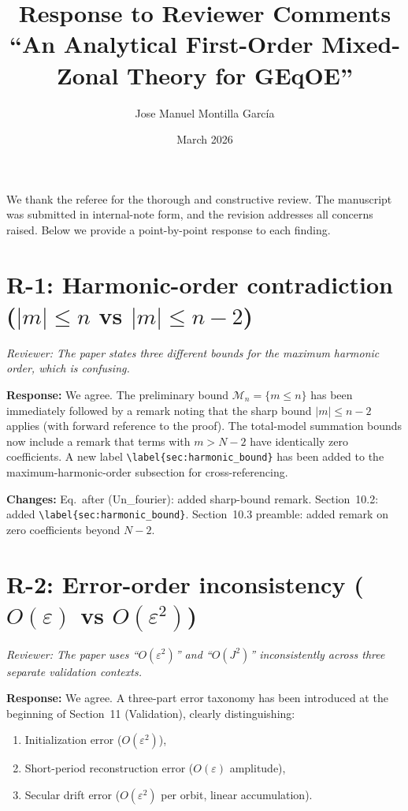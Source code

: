 \documentclass[11pt]{article}
\title{Response to Reviewer Comments\\[4pt]
\large ``An Analytical First-Order Mixed-Zonal Theory for GEqOE''}
\author{Jose Manuel Montilla Garc\'ia}
\date{March 2026}
\newcommand{\rev}[1]{\textcolor{revcolor}{\emph{#1}}}
\begin{document}
\maketitle

We thank the referee for the thorough and constructive review. The
manuscript was submitted in internal-note form, and the revision addresses
all concerns raised. Below we provide a point-by-point response to each
finding.

\bigskip

\section*{R-1: Harmonic-order contradiction ($|m| \le n$ vs $|m| \le n-2$)}

\rev{Reviewer: The paper states three different bounds for the maximum
harmonic order, which is confusing.}

\textbf{Response:} We agree. The preliminary bound $\mathcal{M}_n = \{m \le n\}$
has been immediately followed by a remark noting that the sharp bound
$|m| \le n-2$ applies (with forward reference to the proof). The total-model
summation bounds now include a remark that terms with $m > N-2$ have
identically zero coefficients. A new label \verb|\label{sec:harmonic_bound}|
has been added to the maximum-harmonic-order subsection for cross-referencing.

\textbf{Changes:} Eq.~after (Un\_fourier): added sharp-bound remark.
Section~10.2: added \verb|\label{sec:harmonic_bound}|.
Section~10.3 preamble: added remark on zero coefficients beyond $N-2$.

\section*{R-2: Error-order inconsistency ($O(\varepsilon)$ vs $O(\varepsilon^2)$)}

\rev{Reviewer: The paper uses ``$O(\varepsilon^2)$'' and ``$O(J^2)$''
inconsistently across three separate validation contexts.}

\textbf{Response:} We agree. A three-part error taxonomy has been introduced
at the beginning of Section~11 (Validation), clearly distinguishing:
\begin{enumerate}[nosep]
\item Initialization error ($O(\varepsilon^2)$),
\item Short-period reconstruction error ($O(\varepsilon)$ amplitude),
\item Secular drift error ($O(\varepsilon^2)$ per orbit, linear accumulation).
\end{enumerate}
\end{document}

